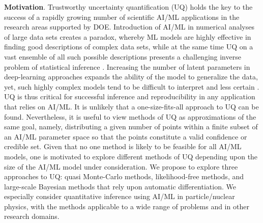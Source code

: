 \documentclass[11pt,titlepage,
preprint,
aps,prd,
nofootinbib,
superscriptaddress,
showpacs,
amsmath,
amssymb
]{article}
\begin{document}
\clearpage

\vspace{0.2cm}


{\bf Motivation}.
Trustworthy  uncertainty quantification (UQ) holds the key to the success of
a rapidly growing number of scientific AI/ML applications in the
research areas supported by DOE. Introduction of AI/ML in numerical
analyses of large data sets creates a paradox, whereby ML models
are highly effective in finding good descriptions of complex data sets,
while at the same time UQ on a vast ensemble of all such possible
descriptions presents a challenging inverse problem of statistical
inference \cite{Cranmer:2019eaq}. Increasing the number of latent parameters in deep-learning
approaches expands the ability of the model to generalize the data, yet, such highly complex models tend to be difficult to interpret \cite{Shanahan:2022ifi} and less certain \cite{Puy:2022a}.
UQ is thus critical for successful inference and reproducibility in any application that relies on AI/ML. 
It is unlikely that a one-size-fits-all approach to UQ can be found.  Nevertheless, it is useful to view methods of UQ as approximations of the same goal, namely, distributing a given number of points within a finite subset of an AI/ML parameter space so that the points constitute a valid confidence or credible set. 
Given that no one method is likely to be feasible for all AI/ML models, one is motivated to explore different methods of UQ depending upon the size of the AI/ML model under consideration. 
We propose to explore three approaches to UQ: quasi Monte-Carlo methods, likelihood-free methods, and large-scale Bayesian methods that rely upon automatic differentiation. We especially consider quantitative inference using AI/ML in particle/nuclear physics, with the methods applicable to a wide range of problems and in other research domains. 


\vspace{12pt}{\bf Exploration of multivariate likelihoods with quasi Monte-Carlo methods.}
\end{document}

